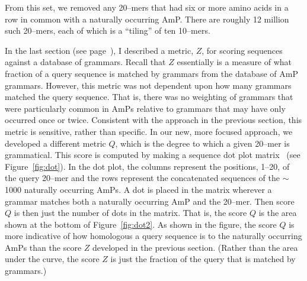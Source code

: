     From this set, we removed any 20--mers that had
    six or more amino acids in a row in common with
    a naturally occurring AmP.  There are roughly 12
    million such 20--mers, each of which is a ``tiling''
    of ten 10--mers.



In the last section (see page~\pageref{section:preliminary}), I
described a metric, $Z$, for scoring sequences against a database of
grammars.  Recall that $Z$ essentially is a measure of what fraction
of a query sequence is matched by grammars from the database of AmP
grammars.  However, this metric was not dependent upon how many
grammars matched the query sequence.  That is, there was no
weighting of grammars that were particularly common in AmPs relative
to grammars that may have only occurred once or twice.  Consistent
with the approach in the previous section, this metric is sensitive,
rather than specific.  In our new, more focused approach, we
developed a different metric $Q$, which is the degree to which a
given 20--mer is grammatical.  This score is computed by making a
sequence dot plot matrix~\cite{maizel1981enhanced} (see
Figure~\vref{fig:dot}).  In the dot plot, the columns represent the
positions, 1--20, of the query 20--mer and the rows represent the
concatenated sequences of the $\sim$1000 naturally occurring AmPs. A
dot is placed in the matrix wherever a grammar matches both a
naturally occurring AmP and the 20--mer.  Then score $Q$ is then
just the number of dots in the matrix.  That is, the score $Q$ is
the area shown at the bottom of Figure~\vref{fig:dot2}.  As shown in
the figure, the score $Q$ is more indicative of how homologous a
query sequence is to the naturally occurring AmPs than the score $Z$
developed in the previous section.  (Rather than the area under the
curve, the score $Z$ is just the fraction of the query that is
matched by grammars.)

